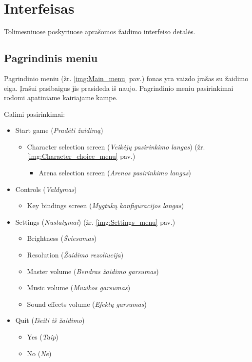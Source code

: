 \documentclass{VUMIFPSkursinis}
\begin{document}
\section{Interfeisas}
Tolimesniuose poskyriuose aprašomos žaidimo interfeiso detalės.


\subsection{Pagrindinis meniu}
Pagrindinio meniu (žr. \ref{img:Main_menu} pav.) fonas yra vaizdo įrašas su žaidimo eiga. Įrašui pasibaigus jis prasideda iš naujo.  Pagrindinio meniu pasirinkimai rodomi apatiniame kairiajame kampe.\newline

Galimi pasirinkimai:
\begin{itemize}
    \item Start game (\textit{Pradėti žaidimą})
    \begin{itemize}
        \item Character selection screen (\textit{Veikėjų pasirinkimo langas}) (žr. \ref{img:Character_choice_menu} pav.)
        \begin{itemize}
            \item Arena selection screen (\textit{Arenos pasirinkimo langas})
        \end{itemize}
    \end{itemize}
    \item Controls (\textit{Valdymas})
    \begin{itemize}
        \item Key bindings screen (\textit{Mygtukų konfigūracijos langas})
    \end{itemize}
    \item Settings (\textit{Nustatymai}) (žr. \ref{img:Settings_menu} pav.)
    \begin{itemize}
        \item Brightness (\textit{Šviesumas})
        \item Resolution (\textit{Žaidimo rezoliucija})
        \item Master volume (\textit{Bendras žaidimo garsumas})
        \item Music volume (\textit{Muzikos garsumas})
        \item Sound effects volume (\textit{Efektų garsumas})
    \end{itemize}
    \item Quit (\textit{Išeiti iš žaidimo})
    \begin{itemize}
        \item Yes (\textit{Taip})
        \item No (\textit{Ne})
    \end{itemize}
\end{itemize}
\end{document}
